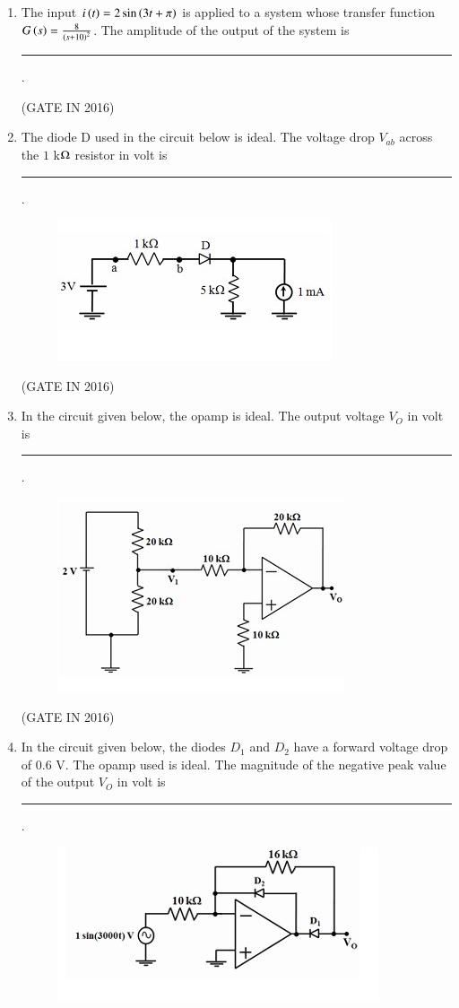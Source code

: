 \documentclass[journal,12pt,onecolumn]{IEEEtran}
\theoremstyle{remark}
\begin{document}
\begin{enumerate}
\item The input $i\left(t\right) = 2\sin\left(3t + \pi\right)$ is applied to a system whose transfer function $G\left(s\right) = \frac{8}{\left(s+10\right)^2}$.
The amplitude of the output of the system is \rule{2cm}{0.4pt}.

\hfill{(GATE IN 2016)}

\item The diode D used in the circuit below is ideal. The voltage drop $V_{ab}$ across the $1$ k$\ohm$ resistor in volt is \rule{2cm}{0.4pt}.
\begin{figure}[H]
\centering
\includegraphics[width=0.6\columnwidth]{figs/z6.jpg}
\caption*{}
\label{fig:z6}
\end{figure}

\hfill{(GATE IN 2016)}

\item In the circuit given below, the opamp is ideal. The output voltage $V_O$ in volt is \rule{2cm}{0.4pt}.
\begin{figure}[H]
\centering
\includegraphics[width=0.5\columnwidth]{figs/z7.jpg}
\caption*{}
\label{fig:z7}
\end{figure}

\hfill{(GATE IN 2016)}

\item In the circuit given below, the diodes $D_1$ and $D_2$ have a forward voltage drop of $0.6$ V. The opamp used is ideal. The magnitude of the negative peak value of the output $V_O$ in volt is \rule{2cm}{0.4pt}.
\begin{figure}[H]
\centering
\includegraphics[width=0.6\columnwidth]{figs/z8.jpg}
\caption*{}
\label{fig:z8}
\end{figure}


\end{enumerate}
\end{document}

